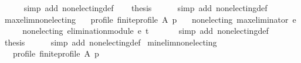 \begin{isabellebody}
\ \ \ \ \isamarkupfalse%
\ {\isacharparenleft}{\kern0pt}simp\ add{\isacharcolon}{\kern0pt}\ non{\isacharunderscore}{\kern0pt}electing{\isacharunderscore}{\kern0pt}def{\isacharparenright}{\kern0pt}\isanewline
\ \ \isamarkupfalse%
\ {\isacharquery}{\kern0pt}thesis\isanewline
\ \ \ \ \isamarkupfalse%
\ {\isacharparenleft}{\kern0pt}simp\ add{\isacharcolon}{\kern0pt}\ non{\isacharunderscore}{\kern0pt}electing{\isacharunderscore}{\kern0pt}def{\isacharparenright}{\kern0pt}\isanewline
{}\isamarkupfalse%
%
\endisatagproof
{\isafoldproof}%
%
\isadelimproof
\isanewline
%
\endisadelimproof
\isanewline
{}\isamarkupfalse%
\ max{\isacharunderscore}{\kern0pt}elim{\isacharunderscore}{\kern0pt}non{\isacharunderscore}{\kern0pt}electing{\isacharcolon}{\kern0pt}\isanewline
\ \ \ profile{\isacharcolon}{\kern0pt}\ {\isachardoublequoteopen}finite{\isacharunderscore}{\kern0pt}profile\ A\ p{\isachardoublequoteclose}\isanewline
\ \ \ {\isachardoublequoteopen}non{\isacharunderscore}{\kern0pt}electing\ {\isacharparenleft}{\kern0pt}max{\isacharunderscore}{\kern0pt}eliminator\ e{\isacharparenright}{\kern0pt}{\isachardoublequoteclose}\isanewline
%
\isadelimproof
%
\endisadelimproof
%
\isatagproof
{}\isamarkupfalse%
\ {\isacharminus}{\kern0pt}\isanewline
\ \ \isamarkupfalse%
\ {\isachardoublequoteopen}non{\isacharunderscore}{\kern0pt}electing\ {\isacharparenleft}{\kern0pt}elimination{\isacharunderscore}{\kern0pt}module\ e\ t\ {\isacharparenleft}{\kern0pt}{\isacharless}{\kern0pt}{\isacharparenright}{\kern0pt}{\isacharparenright}{\kern0pt}{\isachardoublequoteclose}\isanewline
\ \ \ \ \isamarkupfalse%
\ {\isacharparenleft}{\kern0pt}simp\ add{\isacharcolon}{\kern0pt}\ non{\isacharunderscore}{\kern0pt}electing{\isacharunderscore}{\kern0pt}def{\isacharparenright}{\kern0pt}\isanewline
\ \ \isamarkupfalse%
\ {\isacharquery}{\kern0pt}thesis\isanewline
\ \ \ \ \isamarkupfalse%
\ {\isacharparenleft}{\kern0pt}simp\ add{\isacharcolon}{\kern0pt}\ non{\isacharunderscore}{\kern0pt}electing{\isacharunderscore}{\kern0pt}def{\isacharparenright}{\kern0pt}\isanewline
{}\isamarkupfalse%
%
\endisatagproof
{\isafoldproof}%
%
\isadelimproof
\isanewline
%
\endisadelimproof
\isanewline
{}\isamarkupfalse%
\ min{\isacharunderscore}{\kern0pt}elim{\isacharunderscore}{\kern0pt}non{\isacharunderscore}{\kern0pt}electing{\isacharcolon}{\kern0pt}\isanewline
\ \ \ profile{\isacharcolon}{\kern0pt}\ {\isachardoublequoteopen}finite{\isacharunderscore}{\kern0pt}profile\ A\ p{\isachardoublequoteclose}\isanewline

\end{isabellebody}
